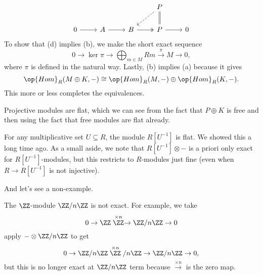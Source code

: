 \[\begin{tikzcd}
	&&& P \\
	0 & A & B & P & 0
	\arrow[Rightarrow, no head, from=1-4, to=2-4]
	\arrow[dashed, from=1-4, to=2-3]
	\arrow[two heads, from=2-3, to=2-4]
	\arrow[from=2-1, to=2-2]
	\arrow[from=2-2, to=2-3]
	\arrow[from=2-4, to=2-5]
\end{tikzcd}\]
To show that (d) implies (b), we make the short exact sequence
\[0\to\ker\pi\to\bigoplus_{m\in M}Rm\stackrel\pi\to M\to 0,\]
where $\pi$ is defined in the natural way. Lastly, (b) implies (a) because it gives
\[\op{Hom}_R(M\oplus K,-)\cong\op{Hom}_R(M,-)\oplus\op{Hom}_R(K,-).\]
This more or less completes the equivalences.
\begin{example}
	Projective modules are flat, which we can see from the fact that $P\oplus K$ is free and then using the fact that free modules are flat already.
\end{example}
\begin{example}
	For any multiplicative set $U\subseteq R$, the module $R\left[U^{-1}\right]$ is flat. We showed this a long time ago. As a small aside, we note that $R\left[U^{-1}\right]\otimes-$ is a priori only exact for $R\left[U^{-1}\right]$-modules, but this restricts to $R$-modules just fine (even when $R\to R\left[U^{-1}\right]$ is not injective).
\end{example}
And let's see a non-example.
\begin{nex}
	The $\ZZ$-module $\ZZ/n\ZZ$ is not exact. For example, we take
	\[0\to\ZZ\stackrel{\times n}\ZZ\to\ZZ/n\ZZ\to0\]
	apply $-\otimes\ZZ/n\ZZ$ to get
	\[0\to\ZZ/n\ZZ\stackrel{\times n}\ZZ/n\ZZ\to\ZZ/n\ZZ\to0,\]
	but this is no longer exact at $\ZZ/n\ZZ$ term because $\stackrel{\times n}\to$ is the zero map.
\end{nex}


